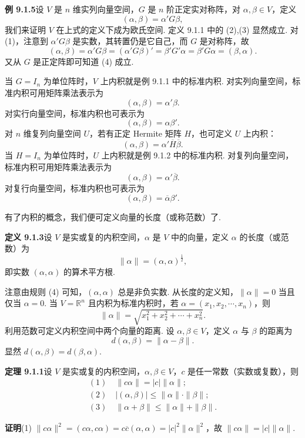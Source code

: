\documentclass[UTF8,12pt,a4paper,fontset=fandol]{ctexart}
\begin{document}
\noindent\textbf{例 9.1.5}\quad 设 $V$ 是 $n$ 维实列向量空间，$G$ 是 $n$ 阶正定实对称阵，对 $\alpha,\beta\in V$，定义
\[
  (\alpha,\beta)=\alpha'G\beta,
\]
我们来证明 $V$ 在上式的定义下成为欧氏空间. 定义 9.1.1 中的 (2),(3) 显然成立. 对 (1)，注意到 $\alpha'G\beta$ 是实数，其转置仍是它自己，而 $G$ 是对称阵，故
\[
  (\alpha,\beta)=\alpha'G\beta=(\alpha'G\beta)'=\beta'G'\alpha=\beta'G\alpha=(\beta,\alpha).
\]
又从 $G$ 是正定阵即可知道 (4) 成立.

当 $G=I_n$ 为单位阵时，$V$ 上内积就是例 9.1.1 中的标准内积. 对实列向量空间，标准内积可用矩阵乘法表示为
\[
  (\alpha,\beta)=\alpha'\beta.
\]
对实行向量空间，标准内积也可表示为
\[
  (\alpha,\beta)=\alpha\beta'.
\]
对 $n$ 维复列向量空间 $U$，若有正定 Hermite 矩阵 $H$，也可定义 $U$ 上内积：
\[
  (\alpha,\beta)=\alpha'\overline H\overline\beta.
\]
当 $H=I_n$ 为单位阵时，$U$ 上内积就是例 9.1.2 中的标准内积. 对复列向量空间，标准内积可用矩阵乘法表示为
\[
  (\alpha,\beta)=\alpha'\overline\beta.
\]
对复行向量空间，标准内积也可表示为
\[
  (\alpha,\beta)=\overline\alpha\beta'.
\]

有了内积的概念，我们便可定义向量的长度（或称范数）了.

\noindent\textbf{定义 9.1.3}\quad 设 $V$ 是实或复的内积空间，$\alpha$ 是 $V$ 中的向量，定义 $\alpha$ 的长度（或范数）为
\[
  \|\alpha\|=(\alpha,\alpha)^{\frac12},
\]
即实数 $(\alpha,\alpha)$ 的算术平方根.

注意由规则 (4) 可知，$(\alpha,\alpha)$ 总是非负实数. 从长度的定义知，$\|\alpha\|=0$ 当且仅当 $\alpha=0$. 当 $V=\mathbb R^n$ 且内积为标准内积时，若 $\alpha=(x_1,x_2,\cdots,x_n)$，则
\begin{equation}
  \|\alpha\|=\sqrt{x_1^2+x_2^2+\cdots+x_n^2}.
  \tag{9.1.2}
\end{equation}
利用范数可定义内积空间中两个向量的距离. 设 $\alpha,\beta\in V$，定义 $\alpha$ 与 $\beta$ 的距离为
\[
  d(\alpha,\beta)=\|\alpha-\beta\|.
\]
显然 $d(\alpha,\beta)=d(\beta,\alpha)$.

\noindent\textbf{定理 9.1.1}\quad 设 $V$ 是实或复的内积空间，$\alpha,\beta\in V$，$c$ 是任一常数（实数或复数），则
\[
\begin{gathered}
  (1)\quad \|c\alpha\|=|c|\|\alpha\|;\\
  (2)\quad |(\alpha,\beta)|\le \|\alpha\|\cdot\|\beta\|;\\
  (3)\quad \|\alpha+\beta\|\le \|\alpha\|+\|\beta\|.
\end{gathered}
\]

\noindent\textbf{证明}\quad (1) $\|c\alpha\|^2=(c\alpha,c\alpha)=c\overline c(\alpha,\alpha)=|c|^2\|\alpha\|^2$，故 $\|c\alpha\|=|c|\|\alpha\|$.
\end{document}
